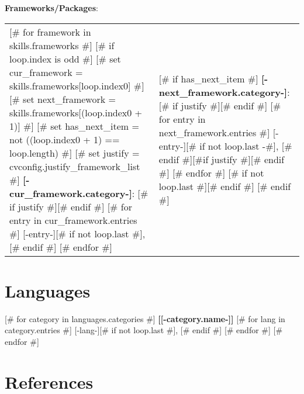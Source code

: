 \documentclass[letterpaper,11pt]{article}
\newcommand{\skfill}{\hfill}
\begin{document}
\textbf{Frameworks/Packages}:\vspace{1mm}
\setlength{}
\noindent\begin{tabularx}{\textwidth}{@{}bb@{}}
	[# for framework in skills.frameworks #]
	[# if loop.index is odd #]
		[# set cur_framework = skills.frameworks[loop.index0] #]
		[# set next_framework = skills.frameworks[(loop.index0 + 1)] #]
		[# set has_next_item = not ((loop.index0 + 1) == loop.length) #]
		[# set justify = cvconfig.justify_framework_list #]
		\textbf{[-cur_framework.category-]}: [# if justify #]\skfill[# endif #]
		[# for entry in cur_framework.entries #]
		[-entry-][# if not loop.last #], [# endif #]
		[# endfor #]
		&
		[# if has_next_item #]
		\textbf{[-next_framework.category-]}: [# if justify #]\skfill[# endif #]
		[# for entry in next_framework.entries #]
		[-entry-][# if not loop.last -#], [# endif #][#if justify #]\skfill[# endif #]
		[# endfor #]
		[# if not loop.last #]\vspace{0.5mm}[# endif #]
		[# endif #]
		\\
	[# endif #]
	[# endfor #]
\end{tabularx}


\section{Languages}

[# for category in languages.categories #]
\textbf{[[-category.name-]]} 
[# for lang in category.entries #]
[-lang-][# if not loop.last #], [# endif #]
[# endfor #] 
[# endfor #]

\clearpage

\section{References}
\end{document}
